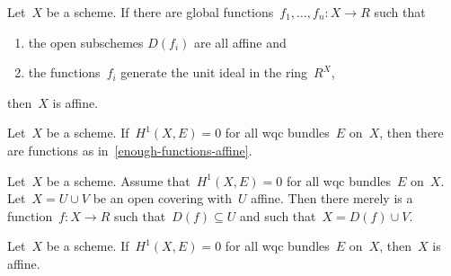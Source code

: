 



\begin{lemma}\label{enough-functions-affine}
  Let~$X$ be a scheme. If there are global functions~$f_1,\ldots,f_n : X \to R$
  such that
  \begin{enumerate}
    \item the open subschemes $D(f_i)$ are all affine and
    \item the functions~$f_i$ generate the unit ideal in the ring~$R^X$,
  \end{enumerate}
  then~$X$ is affine.
\end{lemma}

\begin{proposition}
  Let~$X$ be a scheme. If~$H^1(X, E) = 0$ for all wqc bundles~$E$ on~$X$, then
  there are functions as in~\cref{enough-functions-affine}.
\end{proposition}

\begin{lemma}
  Let~$X$ be a scheme. Assume that~$H^1(X, E) = 0$ for all wqc bundles~$E$
  on~$X$. Let~$X = U \cup V$ be an open covering with~$U$ affine. Then there
  merely is a function~$f : X \to R$ such that~$D(f) \subseteq U$ and such
  that~$X = D(f) \cup V$.
\end{lemma}

\begin{theorem}
  Let~$X$ be a scheme. If~$H^1(X, E) = 0$ for all wqc bundles~$E$
  on~$X$, then~$X$ is affine.
\end{theorem}
